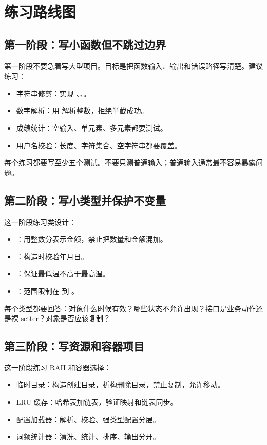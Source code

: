 \chapter{练习路线图}

\section{第一阶段：写小函数但不跳过边界}

第一阶段不要急着写大型项目。目标是把函数输入、输出和错误路径写清楚。建议练习：

\begin{itemize}
  \item 字符串修剪：实现 、、。
  \item 数字解析：用  解析整数，拒绝半截成功。
  \item 成绩统计：空输入、单元素、多元素都要测试。
  \item 用户名校验：长度、字符集合、空字符串都要覆盖。
\end{itemize}

每个练习都要写至少五个测试。不要只测普通输入；普通输入通常最不容易暴露问题。

\section{第二阶段：写小类型并保护不变量}

这一阶段练习类设计：

\begin{itemize}
  \item {}：用整数分表示金额，禁止把数量和金额混加。
  \item {}：构造时校验年月日。
  \item {}：保证最低温不高于最高温。
  \item {}：范围限制在  到 。
\end{itemize}

每个类型都要回答：对象什么时候有效？哪些状态不允许出现？接口是业务动作还是裸 setter？对象是否应该复制？

\section{第三阶段：写资源和容器项目}

这一阶段练习 RAII 和容器选择：

\begin{itemize}
  \item 临时目录：构造创建目录，析构删除目录，禁止复制，允许移动。
  \item LRU 缓存：哈希表加链表，验证映射和链表同步。
  \item 配置加载器：解析、校验、强类型配置分层。
  \item 词频统计器：清洗、统计、排序、输出分开。
\end{itemize}

